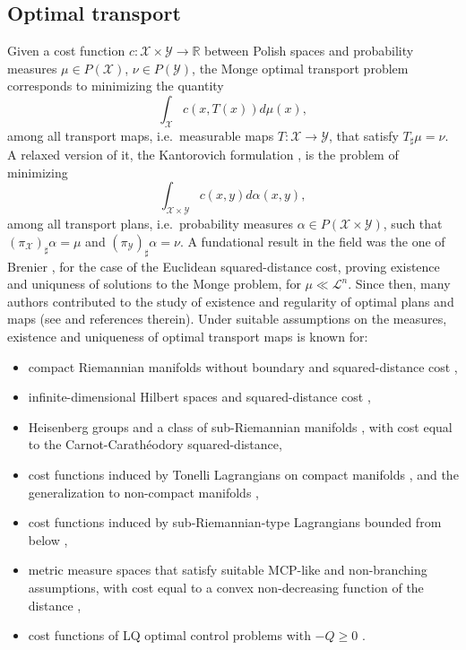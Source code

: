 \documentclass[reqno]{amsart}
\theoremstyle{plain}
\theoremstyle{definition}
\theoremstyle{remark}
\begin{document}
        
	\subsection{Optimal transport}
	Given a cost function $c:\mathcal{X}\times\mathcal{Y}\to\mathbb{R}$ between Polish spaces and probability measures $\mu\in P(\mathcal{X})$, $\nu\in P(\mathcal{Y})$, the Monge optimal transport problem \cite{monge1781} corresponds to minimizing the quantity
	\begin{equation}
		\int_{\mathcal{X}}c(x,T(x))d\mu(x),
	\end{equation}
	among all transport maps, i.e.\ measurable maps $T:\mathcal{X}\to\mathcal{Y}$, that satisfy $T_{\sharp}\mu=\nu$. A relaxed version of it, the Kantorovich formulation \cite{Kantorovich2006}, is the problem of minimizing 
	\begin{equation}
		\int_{\mathcal{X}\times\mathcal{Y}}c(x,y)d\alpha(x,y),
	\end{equation}
	among all transport plans, i.e.\ probability measures $\alpha\in P(\mathcal{X}\times\mathcal{Y})$, such that $(\pi_{\mathcal{X}})_\sharp\alpha=\mu$ and $(\pi_{\mathcal{Y}})_\sharp\alpha=\nu$. A fundational result in the field was the one of Brenier \cite{Brenier1991}, for the case of the Euclidean squared-distance cost, proving existence
	and uniquness of solutions to the Monge problem, for $\mu \ll \mathscr{L}^n$. Since then, many authors contributed to the study of existence and regularity of optimal plans and maps (see \cite{Villanioldandnew,Usersguide} and references therein). Under suitable assumptions on the measures, existence and uniqueness of optimal transport maps is known for:
	\begin{itemize}
		\item compact Riemannian manifolds without boundary and squared-distance cost \cite{McCann2001},
		\item infinite-dimensional Hilbert spaces and squared-distance cost \cite{ambrosioGradientFlowsMetric2008},
		\item Heisenberg groups \cite{AMBROSIO2004261} and a class of sub-Riemannian manifolds \cite{figalli2009masstransSRmflds}, with cost equal to the Carnot-Carathéodory squared-distance,
		\item cost functions induced by Tonelli Lagrangians on compact manifolds \cite{bernard2007optimalmasstransportationmather}, and the generalization to non-compact manifolds \cite{FathiFigalli},
		\item cost functions induced by sub-Riemannian-type Lagrangians bounded from below \cite{agrachev2007opttransnonholconst},
		\item metric measure spaces that satisfy suitable MCP-like and non-branching assumptions, with cost equal to a convex non-decreasing function of the distance \cite{cavalletti2014existenceuniquenessoptimaltransport,Cavalletti_2017},
        \item cost functions of LQ optimal control problems with $-Q\geq 0$ \cite{hinpomriff2011}.
	\end{itemize} 
\end{document}
